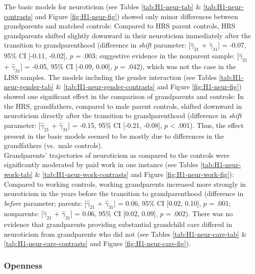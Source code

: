 \documentclass[
  english,
  man,floatsintext]{apa7}
\begin{document}
The basic models for neuroticism (see Tables \ref{tab:H1-neur-tab} \& \ref{tab:H1-neur-contrasts} and Figure \ref{fig:H1-neur-fig}) showed only minor differences between grandparents and matched controls: Compared to HRS parent controls, HRS grandparents shifted slightly downward in their neuroticism immediately after the transition to grandparenthood (difference in \emph{shift} parameter: {[}\(\hat{\gamma}_{21}\) + \(\hat{\gamma}_{31}\){]} = -0.07, 95\% CI {[}-0.11, -0.02{]}, \(p\) = .003; suggestive evidence in the nonparent sample: {[}\(\hat{\gamma}_{21}\) + \(\hat{\gamma}_{31}\){]} = -0.05, 95\% CI {[}-0.09, 0.00{]}, \(p\) = .042), which was not the case in the LISS samples. The models including the gender interaction (see Tables \ref{tab:H1-neur-gender-tab} \& \ref{tab:H1-neur-gender-contrasts} and Figure \ref{fig:H1-neur-fig}) showed one significant effect in the comparison of grandparents and controls: In the HRS, grandfathers, compared to male parent controls, shifted downward in neuroticism directly after the transition to grandparenthood (difference in \emph{shift} parameter: {[}\(\hat{\gamma}_{21}\) + \(\hat{\gamma}_{31}\){]} = -0.15, 95\% CI {[}-0.21, -0.08{]}, \(p\) \textless{} .001). Thus, the effect present in the basic models seemed to be mostly due to differences in the grandfathers (vs.~male controls).\\
Grandparents' trajectories of neuroticism as compared to the controls were significantly moderated by paid work in one instance (see Tables \ref{tab:H1-neur-work-tab} \& \ref{tab:H1-neur-work-contrasts} and Figure \ref{fig:H1-neur-work-fig}): Compared to working controls, working grandparents increased more strongly in neuroticism in the years before the transition to grandparenthood (difference in \emph{before} parameter; parents: {[}\(\hat{\gamma}_{21}\) + \(\hat{\gamma}_{31}\){]} = 0.06, 95\% CI {[}0.02, 0.10{]}, \(p\) = .001; nonparents: {[}\(\hat{\gamma}_{21}\) + \(\hat{\gamma}_{31}\){]} = 0.06, 95\% CI {[}0.02, 0.09{]}, \(p\) = .002). There was no evidence that grandparents providing substantial grandchild care differed in neuroticism from grandparents who did not (see Tables \ref{tab:H1-neur-care-tab} \& \ref{tab:H1-neur-care-contrasts} and Figure \ref{fig:H1-neur-care-fig}).

\hypertarget{openness}{%
\subsubsection{Openness}\label{openness}}
\end{document}
